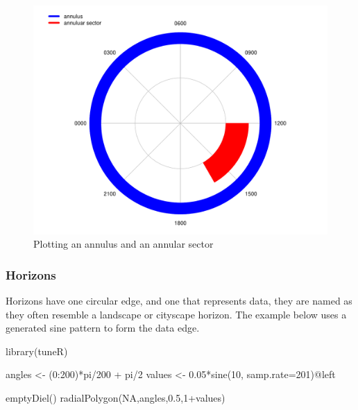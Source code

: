 \documentclass[
]{book}
\newenvironment{Shaded}{\begin{snugshade}}{\end{snugshade}}
\newcommand{\AttributeTok}[1]{\textcolor[rgb]{0.77,0.63,0.00}{#1}}
\newcommand{\ConstantTok}[1]{\textcolor[rgb]{0.00,0.00,0.00}{#1}}
\newcommand{\DecValTok}[1]{\textcolor[rgb]{0.00,0.00,0.81}{#1}}
\newcommand{\FloatTok}[1]{\textcolor[rgb]{0.00,0.00,0.81}{#1}}
\newcommand{\FunctionTok}[1]{\textcolor[rgb]{0.00,0.00,0.00}{#1}}
\newcommand{\NormalTok}[1]{#1}
\newcommand{\OtherTok}[1]{\textcolor[rgb]{0.56,0.35,0.01}{#1}}
\newcommand{\SpecialCharTok}[1]{\textcolor[rgb]{0.00,0.00,0.00}{#1}}
\begin{document}
\begin{figure}

{\centering \includegraphics[width=0.9\linewidth]{_main_files/figure-latex/radialPolygon-annuli-1} 

}

\caption{Plotting an annulus and an annular sector}\label{fig:radialPolygon-annuli}
\end{figure}

\hypertarget{horizons}{%
\subsubsection{Horizons}\label{horizons}}

Horizons have one circular edge, and one that represents data, they are named as they often resemble a landscape or cityscape horizon. The example below uses a generated sine pattern to form the data edge.

\begin{Shaded}
\begin{Highlighting}[]
\FunctionTok{library}\NormalTok{(tuneR)}

\NormalTok{angles }\OtherTok{\textless{}{-}}\NormalTok{ (}\DecValTok{0}\SpecialCharTok{:}\DecValTok{200}\NormalTok{)}\SpecialCharTok{*}\NormalTok{pi}\SpecialCharTok{/}\DecValTok{200} \SpecialCharTok{+}\NormalTok{ pi}\SpecialCharTok{/}\DecValTok{2}
\NormalTok{values }\OtherTok{\textless{}{-}} \FloatTok{0.05}\SpecialCharTok{*}\FunctionTok{sine}\NormalTok{(}\DecValTok{10}\NormalTok{, }\AttributeTok{samp.rate=}\DecValTok{201}\NormalTok{)}\SpecialCharTok{@}\NormalTok{left}

\FunctionTok{emptyDiel}\NormalTok{()}
\FunctionTok{radialPolygon}\NormalTok{(}\ConstantTok{NA}\NormalTok{,angles,}\FloatTok{0.5}\NormalTok{,}\DecValTok{1}\SpecialCharTok{+}\NormalTok{values)}
\end{Highlighting}
\end{Shaded}
\end{document}
